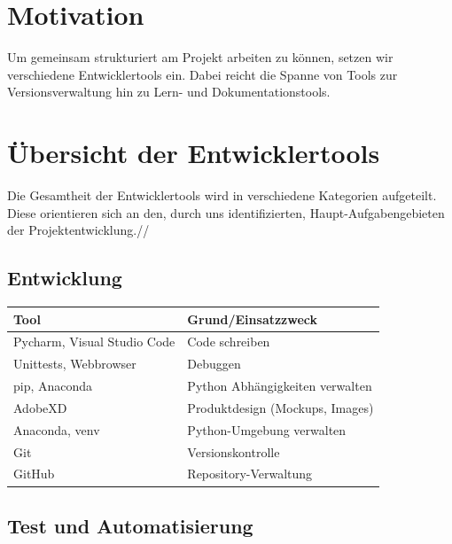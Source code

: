 \documentclass[a4paper,11pt]{scrartcl}
\begin{document}


\section{Motivation}

Um gemeinsam strukturiert am Projekt arbeiten zu können, setzen wir verschiedene Entwicklertools ein.
Dabei reicht die Spanne von Tools zur Versionsverwaltung hin zu Lern- und Dokumentationstools.

\section{Übersicht der Entwicklertools}

Die Gesamtheit der Entwicklertools wird in verschiedene Kategorien aufgeteilt.
Diese orientieren sich an den, durch uns identifizierten, Haupt-Aufgabengebieten der Projektentwicklung.//

\subsection{Entwicklung}

\begin{table}[H]
\begin{center}
\begin{tabular}{|p{4cm}|p{8cm}|}
\hline
\textbf{Tool} &\textbf{Grund/Einsatzzweck} \\ \hline
Pycharm, Visual Studio Code & Code schreiben \\ \hline
Unittests, Webbrowser & Debuggen\\ \hline
pip, Anaconda & Python Abhängigkeiten verwalten\\ \hline
AdobeXD & Produktdesign (Mockups, Images)\\ \hline
Anaconda, venv & Python-Umgebung verwalten\\ \hline
Git & Versionskontrolle\\ \hline
GitHub & Repository-Verwaltung\\ \hline    
\end{tabular}
\end{center}
\end{table}

\subsection{Test und Automatisierung}
\end{document}
